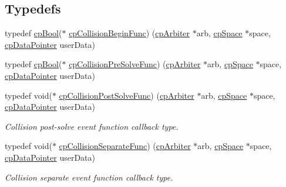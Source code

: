\subsection*{Typedefs}
\begin{DoxyCompactItemize}
\item 
typedef \hyperlink{group__basicTypes_gabc5e752c48f3449ca26ef413ecbd647e}{cp\+Bool}($\ast$ \hyperlink{group__cpSpace_ga3134f145bfc7ca4ef69b350978c26a5a}{cp\+Collision\+Begin\+Func}) (\hyperlink{structcpArbiter}{cp\+Arbiter} $\ast$arb, \hyperlink{structcpSpace}{cp\+Space} $\ast$space, \hyperlink{group__basicTypes_ga2ac2c3c31e21893941f9e4f8ee279447}{cp\+Data\+Pointer} user\+Data)
\item 
typedef \hyperlink{group__basicTypes_gabc5e752c48f3449ca26ef413ecbd647e}{cp\+Bool}($\ast$ \hyperlink{group__cpSpace_ga89b24d53d81a5a028198c3c2d3c39a9d}{cp\+Collision\+Pre\+Solve\+Func}) (\hyperlink{structcpArbiter}{cp\+Arbiter} $\ast$arb, \hyperlink{structcpSpace}{cp\+Space} $\ast$space, \hyperlink{group__basicTypes_ga2ac2c3c31e21893941f9e4f8ee279447}{cp\+Data\+Pointer} user\+Data)
\item 
\mbox{\label{group__cpSpace_gaccb60bbb090c97823f49ee49e4e5d3c3}} 
typedef void($\ast$ \hyperlink{group__cpSpace_gaccb60bbb090c97823f49ee49e4e5d3c3}{cp\+Collision\+Post\+Solve\+Func}) (\hyperlink{structcpArbiter}{cp\+Arbiter} $\ast$arb, \hyperlink{structcpSpace}{cp\+Space} $\ast$space, \hyperlink{group__basicTypes_ga2ac2c3c31e21893941f9e4f8ee279447}{cp\+Data\+Pointer} user\+Data)
\begin{DoxyCompactList}\small\item\em Collision post-\/solve event function callback type. \end{DoxyCompactList}\item 
\mbox{\label{group__cpSpace_ga01427ab634c483879cfed5bb22610487}} 
typedef void($\ast$ \hyperlink{group__cpSpace_ga01427ab634c483879cfed5bb22610487}{cp\+Collision\+Separate\+Func}) (\hyperlink{structcpArbiter}{cp\+Arbiter} $\ast$arb, \hyperlink{structcpSpace}{cp\+Space} $\ast$space, \hyperlink{group__basicTypes_ga2ac2c3c31e21893941f9e4f8ee279447}{cp\+Data\+Pointer} user\+Data)
\begin{DoxyCompactList}\small\item\em Collision separate event function callback type. \end{DoxyCompactList}\item 
\mbox{\label{group__cpSpace_ga93e9005e387fec86eeb4a225ac295a23}} 

\end{DoxyCompactItemize}
